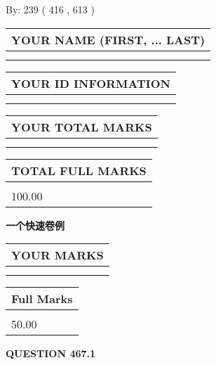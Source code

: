 \documentclass{ctexart}
\begin{document}
   
\hspace{1.0in} By: 
 239 ( 416 ,  613 )
   
   
   
   
\newpage 
\setcounter{page}{ 
   467001 } 
   
   
   
   
\noindent\begin{tabular}{|l|}
\hline
YOUR NAME (FIRST, ... LAST)  \\
\hline
 \\ 
 \\ 
\hline
\end{tabular}
\hspace{0.05in} \begin{tabular}{|l|}
\hline
 YOUR   ID   INFORMATION  \\
\hline
 \\ 
 \\ 
\hline
\end{tabular}
   
   
\vspace{0.2in}\noindent\begin{tabular}{|l|}
\hline
YOUR TOTAL MARKS  \\
\hline
 \\ 
 \\ 
\hline
\end{tabular}
\hspace{0.05in} \begin{tabular}{|l|}
\hline
TOTAL FULL MARKS  \\
\hline
 \\ 
100.00 \\
\hline
\end{tabular}
   
   
 \vspace{0.2in}
{\LARGE {\textbf{ 一个快速卷例}}}
   
   
  
\vspace{0.2in}
  
\noindent\begin{tabular}{|l|}
\hline
 YOUR MARKS  \\
\hline
 \\ 
 \\ 
\hline
\end{tabular}
\hspace{0.05in} \begin{tabular}{|l|}
\hline
 Full Marks  \\
\hline
 \\ 
50.00 \\
\hline
\end{tabular}
{\textbf{\Large{QUESTION
467.1 
}}}
  
\end{document}

